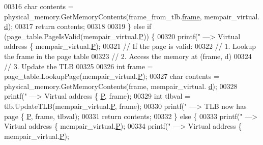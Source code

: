 \begin{DoxyCode}
{{{{{{{{{{{{{{{{{{{{{{{{00316         \textcolor{keywordtype}{char} contents = physical\_memory.GetMemoryContents(frame\_from\_tlb.\hyperlink{structTLBReturnData__t_ac4bdfa0ee74b50048e94321426877439}{frame}, mempair\_virtual.
      \hyperlink{structMemoryPairAddress__t_ad608e86288286889c2658e8043414edf}{d});
00317         \textcolor{keywordflow}{return} contents;
00318 
00319     \} \textcolor{keywordflow}{else} \textcolor{keywordflow}{if} (page\_table.PageIsValid(mempair\_virtual.\hyperlink{structMemoryPairAddress__t_a5bc11426b27565b959f280dd1a18b080}{P})) \{
00320         printf(\textcolor{stringliteral}{" ---> Virtual address \{%
      mempair\_virtual.\hyperlink{structMemoryPairAddress__t_a5bc11426b27565b959f280dd1a18b080}{P});
00321         \textcolor{comment}{// If the page is valid:}
00322         \textcolor{comment}{//      1. Lookup the frame in the page table}
00323         \textcolor{comment}{//      2. Access the memory at (frame, d)}
00324         \textcolor{comment}{//      3. Update the TLB}
00325 
00326         \textcolor{keywordtype}{int} frame = page\_table.LookupPage(mempair\_virtual.\hyperlink{structMemoryPairAddress__t_a5bc11426b27565b959f280dd1a18b080}{P});
00327         \textcolor{keywordtype}{char} contents = physical\_memory.GetMemoryContents(frame, mempair\_virtual.
      \hyperlink{structMemoryPairAddress__t_ad608e86288286889c2658e8043414edf}{d});
00328         printf(\textcolor{stringliteral}{" ---> Virtual address \{%
      \hyperlink{structMemoryPairAddress__t_a5bc11426b27565b959f280dd1a18b080}{P}, frame);
00329         \textcolor{keywordtype}{int} tlbval = tlb.UpdateTLB(mempair\_virtual.\hyperlink{structMemoryPairAddress__t_a5bc11426b27565b959f280dd1a18b080}{P}, frame);
00330         printf(\textcolor{stringliteral}{" ---> TLB now has page \{%
      \hyperlink{structMemoryPairAddress__t_a5bc11426b27565b959f280dd1a18b080}{P}, frame, tlbval);
00331         \textcolor{keywordflow}{return} contents;
00332     \} \textcolor{keywordflow}{else} \{
00333         printf(\textcolor{stringliteral}{" ---> Virtual address \{%
      mempair\_virtual.\hyperlink{structMemoryPairAddress__t_a5bc11426b27565b959f280dd1a18b080}{P});
00334         printf(\textcolor{stringliteral}{" ---> Virtual address \{%
      mempair\_virtual.\hyperlink{structMemoryPairAddress__t_a5bc11426b27565b959f280dd1a18b080}{P});
}}}}}}}}}}}}}}}}}}}}}}}}}}}}}
\end{DoxyCode}
